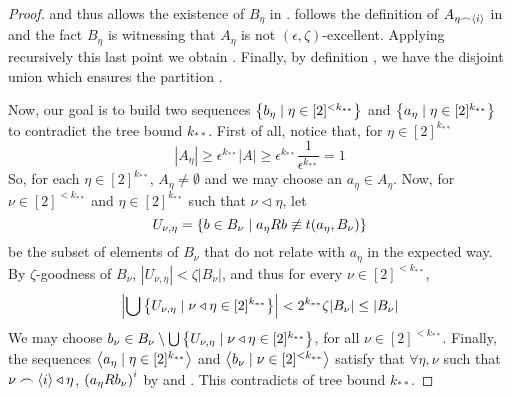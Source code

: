 \begin{lemma}[Claim 5.4]
\begin{proof}
            and thus allows the existence of $B_\eta$ in .
             follows the definition of $A_{\eta \frown \left< i \right>}$ in
             and the fact $B_\eta$ is witnessing that $A_\eta$ is not $(\epsilon, \zeta)$-excellent.
            Applying recursively this last point we obtain .
            Finally, by definition , we have the disjoint union
             which ensures
            the partition .

            Now, our goal is to build two sequences $\left\{ b_\eta \mid \eta \in [2]^{<k_{**}} \right\}$ and
            $\left\{ a_\eta \mid \eta \in [2]^{k_{**}} \right\}$ to contradict the tree bound $k_{**}$.
            First of all, notice that, for $\eta \in [2]^{k_{**}}$
            \[
                |A_\eta| \geq \epsilon^{k_{**}} |A| \geq
                \epsilon^{k_{**}} \frac{1}{\epsilon^{k_{**}}} = 1
            \]
            So, for each $\eta \in [2]^{k_{**}}$, $A_\eta \neq \emptyset$ and we may choose an $a_\eta \in A_\eta$.
            Now, for $\nu \in [2]^{<k_{**}}$ and $\eta \in [2]^{k_{**}}$ such that $\nu \triangleleft \eta$, let
            \[
                U_{\nu,\eta} = \left\{ b \in B_\nu \mid a_\eta R b \not\equiv t(a_\eta, B_\nu) \right\}
            \]
            be the subset of elements of $B_\nu$ that do not relate with $a_\eta$ in the expected way.
            By $\zeta$-goodness of $B_\nu$, $|U_{\nu, \eta}| < \zeta |B_\nu|$, and thus for every $\nu \in [2]^{<k_{**}}$,
            \[
                \left| \bigcup\left\{  U_{\nu,\eta} \mid \nu \triangleleft \eta \in [2]^{k_{**}} \right\} \right| <
                2^{k_{**}} \zeta |B_\nu| \leq |B_\nu|
            \]
            We may choose $b_\nu \in B_\nu \setminus \bigcup\left\{ U_{\nu,\eta} \mid \nu \triangleleft \eta \in [2]^{k_{**}} \right\}$,
            for all $\nu \in [2]^{<k_{**}}$.
            Finally, the sequences $\left< a_\eta \mid \eta \in [2]^{k_{**}} \right>$ and $\left< b_\nu \mid \nu \in [2]^{<k_{**}} \right>$
            satisfy that $\forall \eta, \nu$ such that $\nu \frown \left< i \right> \triangleleft \eta$, $\left( a_\eta R b_\nu \right)^i$
            by  and .
            This contradicts  of tree bound $k_{**}$.
        \end{proof}
    \end{lemma}

